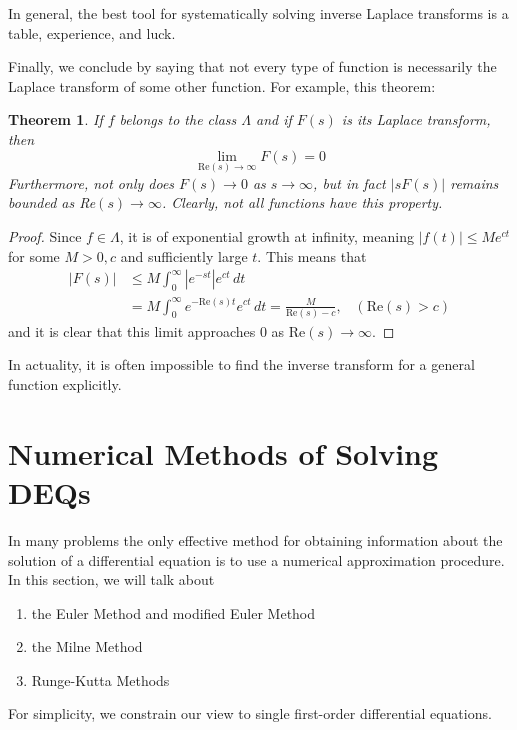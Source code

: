 \documentclass{article}
\newtheorem{theorem}{Theorem}[section]
\theoremstyle{remark}
\theoremstyle{definition}
\begin{document}
    In general, the best tool for systematically solving inverse Laplace transforms is a table, experience, and luck. 

    Finally, we conclude by saying that not every type of function is necessarily the Laplace transform of some other function. For example, this theorem: 

    \begin{theorem}
    If $f$ belongs to the class $\Lambda$ and if $F(s)$ is its Laplace transform, then 
    \[\lim_{\text{Re}(s) \rightarrow\infty} F(s) = 0\]
    Furthermore, not only does $F(s) \rightarrow 0$ as $s \rightarrow \infty$, but in fact $|s F(s)|$ remains bounded as Re$(s) \rightarrow \infty$. Clearly, not all functions have this property. 
    \end{theorem}
    \begin{proof}
    Since $f \in \Lambda$, it is of exponential growth at infinity, meaning $|f(t)| \leq Me^{ct}$ for some $M>0, c$ and sufficiently large $t$. This means that
    \begin{align*}
        |F(s)| & \leq M \int_0^\infty |e^{-st}| e^{ct} \, dt \\
        & = M \int_0^\infty e^{-\text{Re}(s) t} e^{ct}\,dt = \frac{M}{\text{Re}(s) - c}, \;\;\; (\text{Re}(s) > c)
    \end{align*}
    and it is clear that this limit approaches $0$ as Re$(s) \rightarrow \infty$. 
    \end{proof}

    In actuality, it is often impossible to find the inverse transform for a general function explicitly. 

\section{Numerical Methods of Solving DEQs}

  In many problems the only effective method for obtaining information about the solution of a differential equation is to use a numerical approximation procedure. In this section, we will talk about
  \begin{enumerate}
      \item the Euler Method and modified Euler Method
      \item the Milne Method
      \item Runge-Kutta Methods
  \end{enumerate}
  For simplicity, we constrain our view to single first-order differential equations. 
\end{document}
